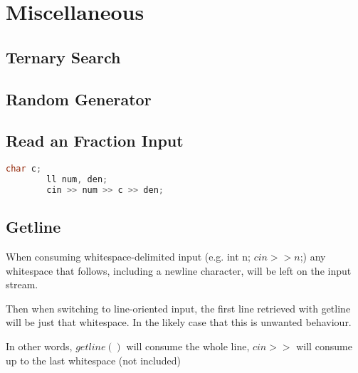 \chapter{Miscellaneous}

\section{Ternary Search}


\section{Random Generator}


\section{Read an Fraction Input}

    \begin{lstlisting}[language=c++]
        char c;
        ll num, den;
        cin >> num >> c >> den;
    \end{lstlisting}

\section{Getline}

When consuming whitespace-delimited input (e.g. int n; $cin >> n$;) any whitespace that follows, 
including a newline character, will be left on the input stream. 

Then when switching to line-oriented input, the first line retrieved with getline will be just that whitespace. In the likely case that this is unwanted behaviour.

In other words, $getline()$ will consume the whole line, $cin>>$ will consume up to the last whitespace (not included) 

